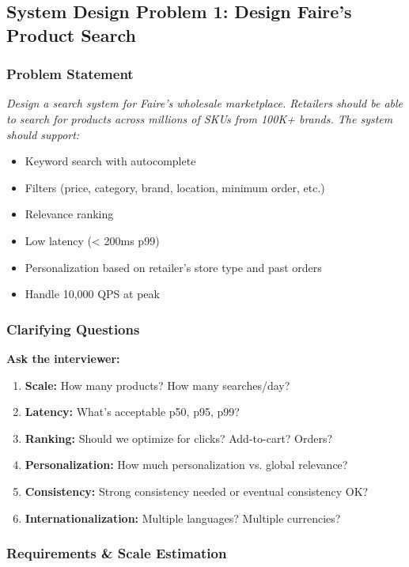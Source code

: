 \documentclass[11pt,letterpaper]{article}
\begin{document}
\subsection{System Design Problem 1: Design Faire's Product Search}

\subsubsection{Problem Statement}

\textit{Design a search system for Faire's wholesale marketplace. Retailers should be able to search for products across millions of SKUs from 100K+ brands. The system should support:}

\begin{itemize}
    \item Keyword search with autocomplete
    \item Filters (price, category, brand, location, minimum order, etc.)
    \item Relevance ranking
    \item Low latency (< 200ms p99)
    \item Personalization based on retailer's store type and past orders
    \item Handle 10,000 QPS at peak
\end{itemize}

\subsubsection{Clarifying Questions}

\textbf{Ask the interviewer:}

\begin{enumerate}
    \item \textbf{Scale:} How many products? How many searches/day?
    \item \textbf{Latency:} What's acceptable p50, p95, p99?
    \item \textbf{Ranking:} Should we optimize for clicks? Add-to-cart? Orders?
    \item \textbf{Personalization:} How much personalization vs. global relevance?
    \item \textbf{Consistency:} Strong consistency needed or eventual consistency OK?
    \item \textbf{Internationalization:} Multiple languages? Multiple currencies?
\end{enumerate}

\subsubsection{Requirements \& Scale Estimation}
\end{document}
